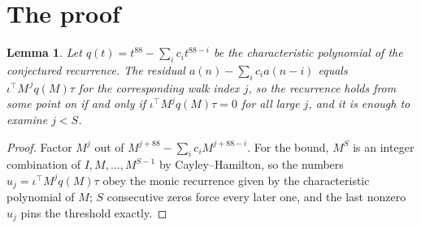 \documentclass[11pt,a4paper]{article}
\theoremstyle{plain}
\newtheorem{lemma}[theorem]{Lemma}
\theoremstyle{definition}
\begin{document}
\section{The proof}

\begin{lemma}\label{lem:crit}
Let $q(t)=t^{88}-\sum_i c_it^{88-i}$ be the characteristic polynomial of the
conjectured recurrence. The residual $a(n)-\sum_ic_ia(n-i)$ equals
$\iota^{\!\top}M^{\,j}q(M)\tau$ for the corresponding walk index $j$, so the recurrence
holds from some point on if and only if $\iota^{\!\top}M^{j}q(M)\tau=0$ for all large $j$,
and it is enough to examine $j<S$.
\end{lemma}

\begin{proof}
Factor $M^{j}$ out of $M^{j+88}-\sum_ic_iM^{j+88-i}$. For the bound, $M^{S}$
is an integer combination of $I,M,\dots,M^{S-1}$ by Cayley--Hamilton, so the numbers
$u_j=\iota^{\!\top}M^{j}q(M)\tau$ obey the monic recurrence given by the characteristic
polynomial of $M$; $S$ consecutive zeros force every later one, and the last nonzero $u_j$
pins the threshold exactly.
\end{proof}
\end{document}
